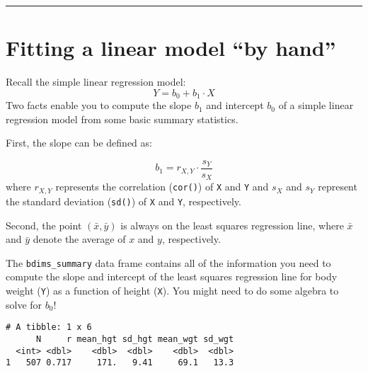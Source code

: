 \documentclass[
]{book}
\newenvironment{Shaded}{\begin{snugshade}}{\end{snugshade}}
\newcommand{\DataTypeTok}[1]{\textcolor[rgb]{0.13,0.29,0.53}{#1}}
\newcommand{\KeywordTok}[1]{\textcolor[rgb]{0.13,0.29,0.53}{\textbf{#1}}}
\newcommand{\NormalTok}[1]{#1}
\newcommand{\OperatorTok}[1]{\textcolor[rgb]{0.81,0.36,0.00}{\textbf{#1}}}
\newcommand{\StringTok}[1]{\textcolor[rgb]{0.31,0.60,0.02}{#1}}
\begin{document}
\begin{center}\rule{0.5\linewidth}{0.5pt}\end{center}

\hypertarget{fitting-a-linear-model-by-hand}{%
\section{Fitting a linear model ``by hand''}\label{fitting-a-linear-model-by-hand}}

Recall the simple linear regression model:
\[Y=b_0 + b_1\cdot X\]
Two facts enable you to compute the slope \(b_1\) and intercept \(b_0\) of a simple linear regression model from some basic summary statistics.

First, the slope can be defined as:

\[b_1=r_{X,Y}\cdot \frac{s_Y}{s_X}\]
where \(r_{X,Y}\) represents the correlation (\texttt{cor()}) of \texttt{X} and \texttt{Y} and \(s_X\) and \(s_Y\) represent the standard deviation (\texttt{sd()}) of \texttt{X} and \texttt{Y}, respectively.

Second, the point \((\bar{x}, \bar{y})\) is always on the least squares regression line, where \(\bar{x}\) and \(\bar{y}\) denote the average of \(x\) and \(y\), respectively.

The \texttt{bdims\_summary} data frame contains all of the information you need to compute the slope and intercept of the least squares regression line for body weight (\texttt{Y}) as a function of height (\texttt{X}). You might need to do some algebra to solve for \(b_0\)!

\begin{Shaded}
\end{Shaded}

\begin{verbatim}
# A tibble: 1 x 6
      N     r mean_hgt sd_hgt mean_wgt sd_wgt
  <int> <dbl>    <dbl>  <dbl>    <dbl>  <dbl>
1   507 0.717     171.   9.41     69.1   13.3
\end{verbatim}
\end{document}
